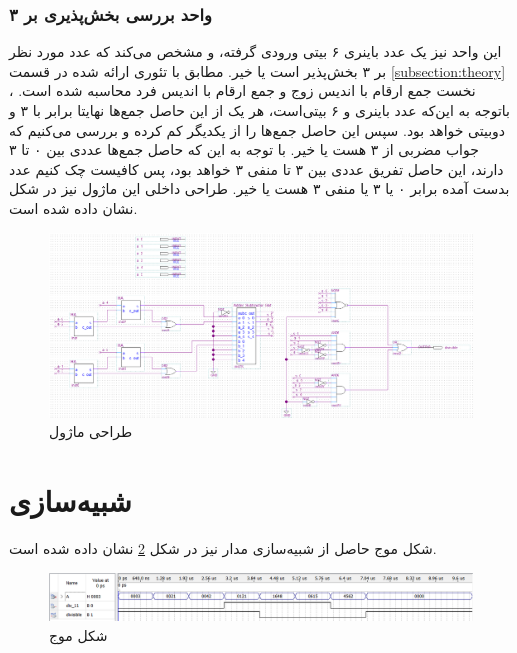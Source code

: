 \documentclass[12pt,onecolumn,a4paper,fleqn]{article}
\begin{document}
	\subsubsection{واحد بررسی بخش‌پذیری بر ۳}
	این واحد نیز یک عدد باینری ۶ بیتی ورودی گرفته، و مشخص می‌کند که عدد مورد نظر بر ۳ بخش‌پذیر است یا خیر. مطابق با تئوری ارائه شده در قسمت
	\ref{subsection:theory}
	، نخست جمع ارقام با اندیس زوج و جمع ارقام با اندیس فرد محاسبه شده است. باتوجه به این‌که عدد باینری و ۶ بیتی‌است، هر یک از این حاصل جمع‌ها نهایتا برابر با ۳ و دوبیتی خواهد بود. سپس این حاصل جمع‌ها را از یکدیگر کم کرده‌ و بررسی می‌کنیم که جواب مضربی از ۳ هست یا خیر. با توجه به این که حاصل جمع‌ها عددی بین ۰ تا ۳ دارند، این حاصل تفریق عددی بین ۳ تا منفی ۳ خواهد بود، پس کافیست چک کنیم عدد بدست آمده برابر ۰ یا ۳ یا منفی ۳ هست یا خیر. طراحی داخلی این ماژول نیز در شکل نشان داده شده است.
	\begin{figure}[H]
		\centering
		\includegraphics[scale=0.4]{source/isDiv3.png}
		\caption{طراحی ماژول }
		\label{div_11}
	\end{figure}
	\pagebreak
	\section{شبیه‌سازی}
	شکل موج حاصل از شبیه‌سازی مدار نیز در شکل \ref{fig:simulation} نشان داده شده است.
	\begin{figure}[H]
		\centering
		\includegraphics[scale=0.65]{source/simulation.png}
		\caption{شکل موج}
		\label{fig:simulation}
	\end{figure}
	
\end{document}
